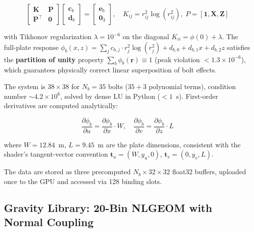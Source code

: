 \documentclass{CVM}
\begin{document}
\begin{equation}
\begin{bmatrix} \mathbf{K} & \mathbf{P} \\ \mathbf{P}^\top & \mathbf{0} \end{bmatrix}
\begin{bmatrix} \mathbf{c}_b \\ \mathbf{d}_b \end{bmatrix}
= \begin{bmatrix} \mathbf{e}_b \\ \mathbf{0}_3 \end{bmatrix},
\quad K_{ij} = r_{ij}^2 \log(r_{ij}^2),\;
P = [\mathbf{1}, \mathbf{X}, \mathbf{Z}]
\label{eq:tps}
\end{equation}

with Tikhonov regularization $\lambda = 10^{-6}$ on the diagonal
$K_{ii} = \phi(0) + \lambda$. The full-plate response
$\phi_b(x,z) = \sum_j c_{b,j} \cdot r_j^2\log(r_j^2) + d_{b,0} + d_{b,1}x + d_{b,2}z$
satisfies the \textbf{partition of unity} property
$\sum_b \phi_b(\mathbf{r}) \equiv 1$ (peak violation $< 1.3\times 10^{-6}$),
which guarantees physically correct linear superposition of bolt effects.

The system is $38\times38$ for $N_b=35$ bolts ($35 + 3$ polynomial terms),
condition number $\sim 4.2\times 10^6$, solved by dense LU in Python ($< 1$~s).
First-order derivatives are computed analytically:

\begin{equation}
\frac{\partial\phi_b}{\partial u} = \frac{\partial\phi_b}{\partial x}\cdot W,\quad
\frac{\partial\phi_b}{\partial v} = \frac{\partial\phi_b}{\partial z}\cdot L
\label{eq:derivs}
\end{equation}

where $W=12.84$~m, $L=9.45$~m are the plate dimensions, consistent with the
shader's tangent-vector convention $\mathbf{t}_u = (W, y_u, 0)$,
$\mathbf{t}_v = (0, y_v, L)$.

The data are stored as three precomputed $N_b \times 32 \times 32$ float32
buffers, uploaded once to the GPU and accessed via 128 binding slots.

\subsection{Gravity Library: 20-Bin NLGEOM with Normal Coupling}
\end{document}
